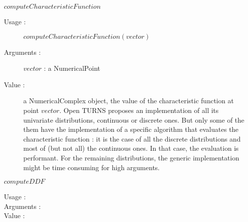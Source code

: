 \begin{description}
\begin{description}
  \item $computeCharacteristicFunction$
    \begin{description}
    \item[Usage :] $computeCharacteristicFunction(vector)$
    \item[Arguments :] $vector$ : a NumericalPoint
    \item[Value :] a NumericalComplex object, the value of the characteristic function at point $vector$. Open TURNS proposes an implementation of all its univariate distributions, continuous or discrete ones. But only some of the them have the implementation of a specific algorithm that evaluates the characteristic function : it is the case of all the discrete distributions and most of (but not all) the continuous ones. In that case, the evaluation is performant. For the remaining distributions, the generic implementation might be time consuming for high arguments.

    \end{description}
    \bigskip

  \item $computeDDF$
    \begin{description}
    \item[Usage :] \rule{0pt}{1em}
    \item[Arguments :] \rule{0pt}{1em}
    \item[Value :] \rule{0pt}{1em}
    \end{description}
    \bigskip


\end{description}
\end{description}
